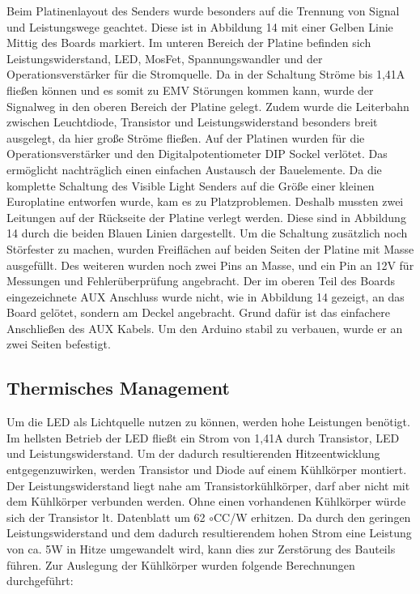 Beim Platinenlayout des Senders wurde besonders auf die Trennung von Signal und Leistungswege geachtet. Diese ist in Abbildung 14 mit einer Gelben Linie Mittig des Boards markiert.
Im unteren Bereich der Platine befinden sich Leistungswiderstand, LED, MosFet, Spannungswandler und der Operationsverstärker für die Stromquelle. Da in der Schaltung Ströme bis 1,41A fließen können und es somit zu EMV Störungen kommen kann, wurde der Signalweg in den oberen Bereich der Platine gelegt. Zudem
wurde die Leiterbahn zwischen Leuchtdiode, Transistor und Leistungswiderstand besonders breit ausgelegt, da hier große Ströme fließen. Auf der Platinen wurden für die Operationsverstärker und den Digitalpotentiometer
DIP Sockel verlötet. Das ermöglicht nachträglich einen einfachen Austausch der Bauelemente. Da die komplette Schaltung des Visible Light Senders auf die Größe einer kleinen Europlatine entworfen wurde, kam es zu Platzproblemen. Deshalb mussten zwei Leitungen auf der Rückseite der Platine verlegt werden. Diese sind in Abbildung 14 durch die beiden Blauen Linien dargestellt.
Um die Schaltung zusätzlich noch Störfester zu machen, wurden Freiflächen auf beiden Seiten der Platine mit Masse ausgefüllt. Des weiteren wurden noch zwei Pins an Masse, und ein Pin an 12V für Messungen und Fehlerüberprüfung angebracht. Der im oberen Teil des Boards eingezeichnete AUX Anschluss wurde nicht, wie in
Abbildung 14 gezeigt, an das Board gelötet, sondern am Deckel angebracht. Grund dafür ist das einfachere Anschließen des AUX Kabels. Um den Arduino stabil zu verbauen, wurde er an zwei Seiten befestigt.

\subsection{Thermisches Management}
\label{subsub:Unterunterabschnitt1}

Um die LED als Lichtquelle nutzen zu können, werden hohe Leistungen benötigt.
Im hellsten Betrieb der LED fließt ein Strom von 1,41A durch Transistor, LED
und Leistungswiderstand. Um der dadurch resultierenden Hitzeentwicklung entgegenzuwirken,
werden Transistor und Diode auf einem Kühlkörper montiert. Der
Leistungswiderstand liegt nahe am Transistorkühlkörper, darf aber nicht mit dem
Kühlkörper verbunden werden.
Ohne einen vorhandenen Kühlkörper würde sich der Transistor lt. Datenblatt um
62 $\circ$CC/W erhitzen. Da durch den geringen Leistungswiderstand und dem dadurch
resultierendem hohen Strom eine Leistung von ca. 5W in Hitze umgewandelt wird,
kann dies zur Zerstörung des Bauteils führen.
Zur Auslegung der Kühlkörper wurden folgende Berechnungen durchgeführt:

